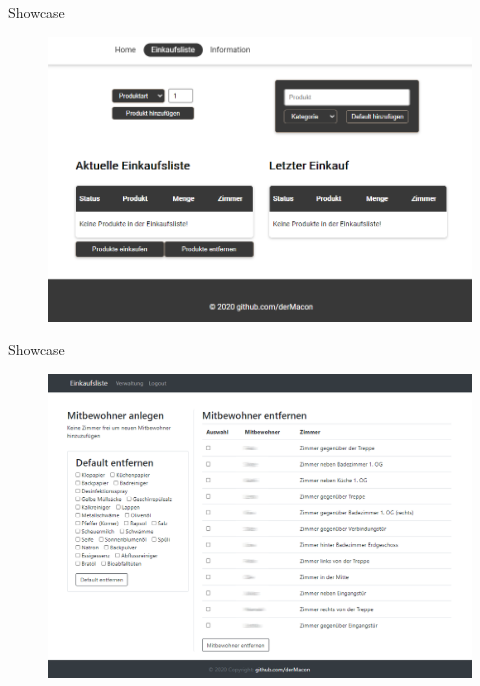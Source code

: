 \begin{frame}{Showcase}

\begin{figure}
\includegraphics[width=.9\linewidth]{./_img/screenshot_01}
\end{figure}

\end{frame}

\begin{frame}{Showcase}

\begin{figure}
\includegraphics[width=.9\linewidth]{./_img/screenshot_02}
\end{figure}

\end{frame}



